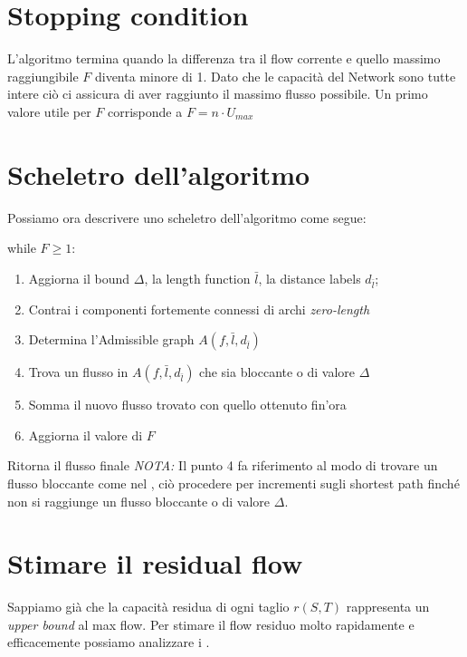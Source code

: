 \section{Stopping condition}
    L'algoritmo termina quando la differenza tra il flow corrente e quello massimo raggiungibile $F$ diventa minore di 1.
    Dato che le capacità del Network sono tutte intere ciò ci assicura di aver raggiunto il massimo flusso possibile.
    Un primo valore utile per $F$ corrisponde a $F = n\cdot U_{max}$

\section{Scheletro dell'algoritmo}
    Possiamo ora descrivere uno scheletro dell'algoritmo come segue:
    
        while $F \ge 1$:\begin{enumerate}
            \item Aggiorna il bound $\Delta$, la length function $\bar{l}$, la distance labels $d_{\bar{l}}$;
            \item Contrai i componenti fortemente connessi di archi \textit{zero-length}
            \item Determina l'Admissible graph $A(f, \bar{l},d_{\bar{l}} )$
            \item Trova un flusso in $A(f, \bar{l},d_{\bar{l}} )$ che sia bloccante o di valore $\Delta$
            \item Somma il nuovo flusso trovato con quello ottenuto fin'ora 
            \item Aggiorna il valore di $F$
        \end{enumerate}
        Ritorna il flusso finale 
    \textit{NOTA:} Il punto 4 fa riferimento al modo di trovare un flusso bloccante come nel , ciò procedere per incrementi sugli shortest path finché non si raggiunge un flusso bloccante o di valore $\Delta$.
\section{Stimare il residual flow}
    Sappiamo già che la capacità residua di ogni taglio $r(S,T)$ rappresenta un \textit{upper bound} al max flow.
    Per stimare il flow residuo molto rapidamente e efficacemente possiamo analizzare i .

